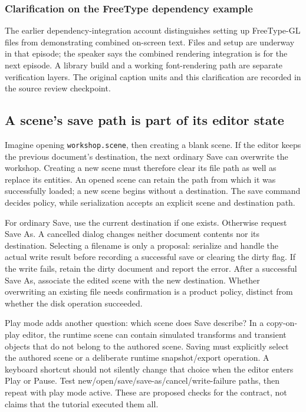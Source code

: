 \subsubsection{Clarification on the FreeType dependency example}\label{06-engine-ii-ch046-clarification-on-the-freetype-dependency-example}

\hypertarget{06-engine-ii-ch046-clarification-on-the-freetype-dependency-example}{}

The earlier dependency-integration account distinguishes setting up FreeType-GL files from demonstrating combined on-screen text. Files and setup are underway in that episode; the speaker says the combined rendering integration is for the next episode. A library build and a working font-rendering path are separate verification layers. The original caption units and this clarification are recorded in the source review checkpoint.

\subsection{A scene's save path is part of its editor state}\label{06-engine-ii-ch046-a-scenes-save-path-is-part-of-its-editor-state}

\hypertarget{06-engine-ii-ch046-a-scenes-save-path-is-part-of-its-editor-state}{}

Imagine opening \texttt{workshop.scene}, then creating a blank scene. If the editor keeps the previous document's destination, the next ordinary Save can overwrite the workshop. Creating a new scene must therefore clear its file path as well as replace its entities. An opened scene can retain the path from which it was successfully loaded; a new scene begins without a destination. The save command decides policy, while serialization accepts an explicit scene and destination path.

For ordinary Save, use the current destination if one exists. Otherwise request Save As. A cancelled dialog changes neither document contents nor its destination. Selecting a filename is only a proposal: serialize and handle the actual write result before recording a successful save or clearing the dirty flag. If the write fails, retain the dirty document and report the error. After a successful Save As, associate the edited scene with the new destination. Whether overwriting an existing file needs confirmation is a product policy, distinct from whether the disk operation succeeded.

Play mode adds another question: which scene does Save describe? In a copy-on-play editor, the runtime scene can contain simulated transforms and transient objects that do not belong to the authored scene. Saving must explicitly select the authored scene or a deliberate runtime snapshot/export operation. A keyboard shortcut should not silently change that choice when the editor enters Play or Pause. Test new/open/save/save-as/cancel/write-failure paths, then repeat with play mode active. These are proposed checks for the contract, not claims that the tutorial executed them all.

